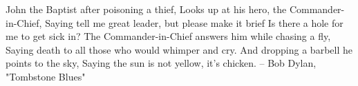 \setcounter{equation}{0}  

John the Baptist after poisoning a thief,
Looks up at his hero, the Commander-in-Chief,
Saying tell me great leader, but please make it brief
Is there a hole for me to get sick in?
 The Commander-in-Chief answers him while chasing a fly,
Saying death to all those who would whimper and cry.
And dropping a barbell he points to the sky,
Saying the sun is not yellow, it's chicken.
		-- Bob Dylan, "Tombstone Blues"


